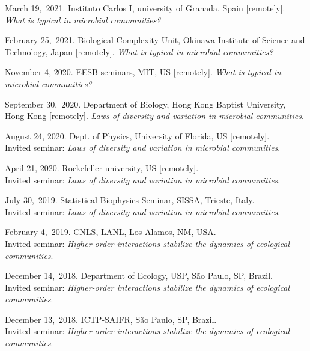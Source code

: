 \documentclass[10pt]{article}
\begin{document}
\begin{outerlist}
    \item March 19,~2021.
	 Instituto Carlos I, university of Granada, Spain [remotely].
	\emph{What is typical in microbial communities?}%

    \item February 25,~2021.
	 Biological Complexity Unit, Okinawa Institute of Science and Technology, Japan [remotely].
	\emph{What is typical in microbial communities?}%

    \item November 4, 2020.
	 EESB seminars, MIT, US [remotely].
	\emph{What is typical in microbial communities?}%

    \item September 30,~2020.
	 Department of Biology, Hong Kong Baptist University, Hong Kong [remotely].
	\emph{Laws of diversity and variation in microbial communities}. %

    \item  August 24, 2020. 
	Dept. of Physics, University of Florida, US [remotely].\\
	Invited seminar: \emph{Laws of diversity and variation in microbial communities}. %

    \item  April 21, 2020. 
	Rockefeller university, US [remotely].\\
	Invited seminar: \emph{Laws of diversity and variation in microbial communities}. %

    \item July 30,~2019. 
	Statistical Biophysics Seminar, SISSA, Trieste, Italy.\\
	Invited seminar: \emph{Laws of diversity and variation in microbial communities}. %

    \item February 4,~2019. 
	CNLS, LANL, Los Alamos, NM, USA.\\
	Invited seminar: \emph{Higher-order interactions stabilize the dynamics of ecological communities}. %

    \item December 14,~2018. 
	Department of Ecology, USP, S\~ao Paulo, SP, Brazil.\\
	Invited seminar: \emph{Higher-order interactions stabilize the dynamics of ecological communities}. %

    \item December 13,~2018. 
	ICTP-SAIFR, S\~ao Paulo, SP, Brazil.\\
	Invited seminar: \emph{Higher-order interactions stabilize the dynamics of ecological communities}. %


\end{outerlist}
\end{document}
